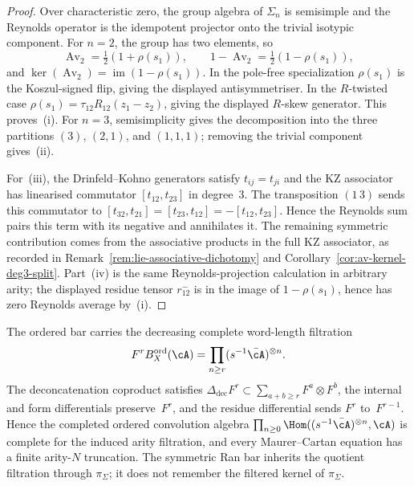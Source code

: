 \begin{proof}
Over characteristic zero, the group algebra of $\Sigma_n$ is
semisimple and the Reynolds operator is the idempotent projector onto
the trivial isotypic component. For \(n=2\), the group has two
elements, so
\[
\operatorname{Av}_2=\tfrac12(1+\rho(s_1)),\qquad
1-\operatorname{Av}_2=\tfrac12(1-\rho(s_1)),
\]
and \(\ker(\operatorname{Av}_2)=\operatorname{im}(1-\rho(s_1))\).
In the pole-free specialization \(\rho(s_1)\) is the Koszul-signed
flip, giving the displayed antisymmetriser. In the \(R\)-twisted case
\(\rho(s_1)=\tau_{12}R_{12}(z_1-z_2)\), giving the displayed
\(R\)-skew generator. This proves~\textup{(i)}.
For \(n=3\), semisimplicity gives the decomposition into the three
partitions $(3)$, $(2,1)$, and $(1,1,1)$; removing the trivial
component gives~\textup{(ii)}.

For~\textup{(iii)}, the Drinfeld--Kohno generators satisfy
$t_{ij}=t_{ji}$ and the KZ associator has linearised commutator
$[t_{12},t_{23}]$ in degree~$3$. The transposition $(1\,3)$ sends this
commutator to $[t_{32},t_{21}]=[t_{23},t_{12}]
=-[t_{12},t_{23}]$. Hence the Reynolds sum pairs this term with its
negative and annihilates it. The remaining symmetric contribution comes
from the associative products in the full KZ associator, as recorded in
Remark~\ref{rem:lie-associative-dichotomy} and
Corollary~\ref{cor:av-kernel-deg3-split}. Part~\textup{(iv)} is the
same Reynolds-projection calculation in arbitrary arity; the displayed
residue tensor \(r^-_{12}\) is in the image of
\(1-\rho(s_1)\), hence has zero Reynolds average by~\textup{(i)}.
\end{proof}

\begin{convention}
\label{conv:bar-length-filtration}
The ordered bar carries the decreasing complete word-length filtration
\[
F^rB^{\mathrm{ord}}_X(\cA)
=\prod_{n\ge r}(s^{-1}\bar\cA)^{\otimes n}.
\]
The deconcatenation coproduct satisfies
$\Delta_{\mathrm{dec}}F^r\subset
\sum_{a+b\ge r}F^a\otimes F^b$, the internal and form differentials
preserve~$F^r$, and the residue differential sends
$F^r$ to~$F^{r-1}$. Hence the completed ordered convolution algebra
$\prod_{n\ge0}\Hom((s^{-1}\bar\cA)^{\otimes n},\cA)$ is complete for
the induced arity filtration, and every Maurer--Cartan equation has a
finite arity-$N$ truncation. The symmetric Ran bar inherits the quotient
filtration through $\pi_\Sigma$; it does not remember the filtered
kernel of $\pi_\Sigma$.
\end{convention}


